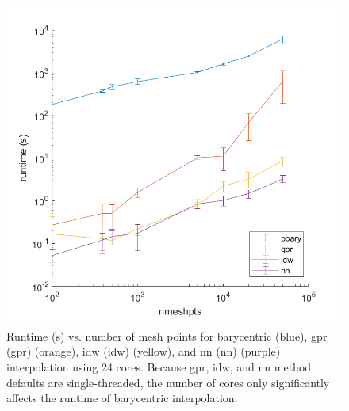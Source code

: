 \documentclass[preprint,12pt]{elsarticle}
\begin{document}
\begin{figure}
    \centering
    \includegraphics{runtime.png}
    \caption{Runtime (s) vs. number of mesh points for barycentric (blue), \acrlong{gpr} (\acrshort{gpr}) (orange), \acrlong{idw} (\acrshort{idw}) (yellow), and \acrlong{nn} (\acrshort{nn}) (purple) interpolation using 24 cores. Because \acrshort{gpr}, \acrshort{idw}, and \acrshort{nn} method defaults are single-threaded, the number of cores only significantly affects the runtime of barycentric interpolation.}
    \label{fig:runtime}
\end{figure}


\end{document}
